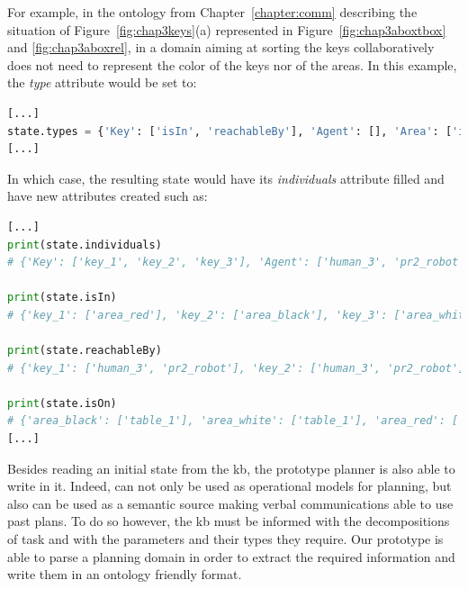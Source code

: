 \documentclass[a4paper,11pt,twoside]{StyleThese}
\begin{document}
For example, in the ontology from Chapter~\ref{chapter:comm} describing the situation of Figure~\ref{fig:chap3keys}(a) represented in Figure~\ref{fig:chap3aboxtbox} and \ref{fig:chap3aboxrel}, in a domain aiming at sorting the keys collaboratively does not need to represent the color of the keys nor of the areas. In this example, the \textit{type} attribute would be set to: 


\begin{lstlisting}[language=Python]
[...]
state.types = {'Key': ['isIn', 'reachableBy'], 'Agent': [], 'Area': ['isOn']}
[...]
\end{lstlisting}
In which case, the resulting state would have its \textit{individuals} attribute filled and have new attributes created such as:


\begin{lstlisting}[language=Python]
[...]
print(state.individuals)
# {'Key': ['key_1', 'key_2', 'key_3'], 'Agent': ['human_3', 'pr2_robot'], 'Area': ['area_black', 'area_white', 'area_red'], 'Table': ['table_1']}

print(state.isIn)
# {'key_1': ['area_red'], 'key_2': ['area_black'], 'key_3': ['area_white']}

print(state.reachableBy)
# {'key_1': ['human_3', 'pr2_robot'], 'key_2': ['human_3', 'pr2_robot'], 'key_3': ['human_3', 'pr2_robot']}

print(state.isOn)
# {'area_black': ['table_1'], 'area_white': ['table_1'], 'area_red': ['table_1']}
[...]
\end{lstlisting}


Besides reading an initial state from the \acrshort{kb}, the prototype planner is also able to write in it. Indeed,  can not only be used as operational models for planning, but also can be used as a semantic source making verbal communications able to use past plans. To do so however, the \acrshort{kb} must be informed with the decompositions of task and with the parameters and their types they require. Our prototype is able to parse a planning domain in order to extract the required information and write them in an ontology friendly format.
\end{document}
